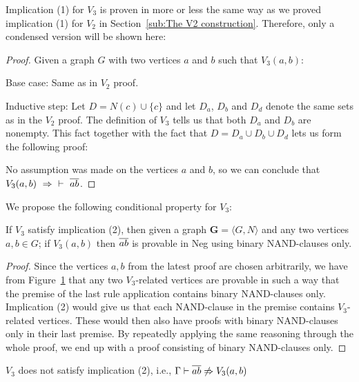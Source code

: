 Implication (1) for $V_3$ is proven in more or less the same way as we proved implication (1) for $V_2$ in Section~\ref{sub:The V2 construction}.
Therefore, only a condensed version will be shown here:
\begin{proof}
  Given a graph $G$ with two vertices $a$ and $b$ such that $V_3(a,b)$:

  Base case: Same as in $V_2$ proof.

  Inductive step: Let $D = N(c) \cup \{ c \}$ and let $D_a$, $D_b$ and $D_d$ denote the same sets as in the $V_2$ proof.
  The definition of $V_3$ tells us that both $D_a$ and $D_b$ are nonempty.
  This fact together with the fact that $D = D_a \cup D_b \cup D_d$ lets us form the following proof:\par
  \begin{figure}[!h]
    \centering
    \begin{prooftree*}
    \end{prooftree*}
    \caption{}
    \label{fig:proof_v3}
  \end{figure}
  No assumption was made on the vertices $a$ and $b$, so we can conclude that $V_3(a,b)~\Rightarrow~\;\vdash~\ol{ab}$.
\end{proof}
We propose the following conditional property for $V_3$:
\begin{lemma}
  If $V_3$ satisfy implication (2), then given a graph $\mathbf{G} = \langle G,N \rangle$ and any two vertices $a,b \in G$;
  if $V_3(a,b)$ then $\ol{ab}$ is provable in Neg using binary NAND-clauses only.
\end{lemma}
\begin{proof}
  Since the vertices $a,b$ from the latest proof are chosen arbitrarily, we have from Figure~\ref{fig:proof_v3} that any two $V_3$-related vertices are provable in such a way that the premise of the last rule application contains binary NAND-clauses only.
  Implication (2) would give us that each NAND-clause in the premise contains $V_3$-related vertices.
  These would then also have proofs with binary NAND-clauses only in their last premise.
  By repeatedly applying the same reasoning through the whole proof, we end up with a proof consisting of binary NAND-clauses only.
\end{proof}
\begin{lemma}
  $V_3$ does not satisfy implication (2), i.e., $\Gamma \vdash \ol{ab} \not \Rightarrow V_3(a,b)$
\end{lemma}
